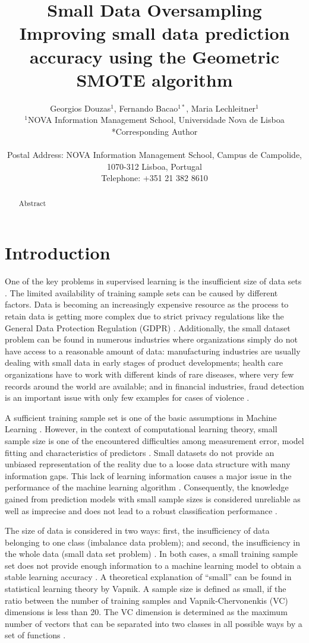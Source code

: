 \documentclass[parskip=full]{scrartcl}
\title{Small Data Oversampling  \\ \LARGE{Improving small data prediction accuracy using the Geometric SMOTE algorithm}}
\author{
	Georgios Douzas\(^{1}\), Fernando Bacao\(^{1*}\), Maria Lechleitner\(^{1}\) 
	\\
	\small{\(^{1}\)NOVA Information Management School, Universidade Nova de Lisboa}
	\\
	\small{*Corresponding Author}
	\\
	\\
	\small{Postal Address: NOVA Information Management School, Campus de Campolide, 1070-312 Lisboa, Portugal}
	\\
	\small{Telephone: +351 21 382 8610}
}
\date{}
\begin{document}
\maketitle

\begin{abstract}
Abstract
\end{abstract}

\section{Introduction}
One of the key problems in supervised learning is the insufficient size of data
sets \cite{Niyogi.1998}. The limited availability of training sample sets can be
caused by different factors. Data is becoming an increasingly expensive resource
\cite{Li.2007} as the process to retain data is getting more complex due to
strict privacy regulations like the General Data Protection Regulation (GDPR)
\cite{EuropeanCommission.2019}. Additionally, the small dataset problem can be
found in numerous industries where organizations simply do not have access to a
reasonable amount of data: manufacturing industries are usually dealing with
small data in early stages of product developments; health care organizations
have to work with different kinds of rare diseases, where very few records
around the world are available; and in financial industries, fraud detection is
an important issue with only few examples for cases of violence
\cite{AbdulLateh.2017}.

A sufficient training sample set is one of the basic assumptions in Machine
Learning \cite{Ivanescu.2006}. However, in the context of computational learning
theory, small sample size is one of the encountered difficulties among
measurement error, model fitting and characteristics of predictors
\cite{AbdulLateh.2017}. Small datasets do not provide an unbiased representation
of the reality due to a loose data structure with many information gaps. This
lack of learning information causes a major issue in the performance of the
machine learning algorithm \cite{Lin.2018}. Consequently, the knowledge gained
from prediction models with small sample sizes is considered unreliable as well
as imprecise and does not lead to a robust classification performance
\cite{AbdulLateh.2017}.

The size of data is considered in two ways: first, the insufficiency of data
belonging to one class (imbalance data problem); and second, the insufficiency
in the whole data (small data set problem) \cite{Sezer.2014}. In both cases, a
small training sample set does not provide enough information to a machine
learning model to obtain a stable learning accuracy \cite{Tsai.2008}. A
theoretical explanation of “small” can be found in statistical learning theory
by Vapnik. A sample size is defined as small, if the ratio between the number of
training samples and Vapnik-Chervonenkis (VC) dimensions is less than 20. The VC dimension is determined as the maximum number of vectors that can be separated into two
classes in all possible ways by a set of functions \cite{Vapnik.2008}. 
\end{document}
